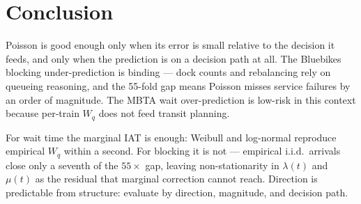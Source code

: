 \section{Conclusion}\label{sec:conclusion}

Poisson is good enough only when its error is small relative to the decision it feeds, and only when the prediction is on a decision path at all. The Bluebikes blocking under-prediction is binding --- dock counts and rebalancing rely on queueing reasoning, and the 55-fold gap means Poisson misses service failures by an order of magnitude. The MBTA wait over-prediction is low-risk in this context because per-train $W_q$ does not feed transit planning.

For wait time the marginal IAT is enough: Weibull and log-normal reproduce empirical $W_q$ within a second. For blocking it is not --- empirical i.i.d.\ arrivals close only a seventh of the $55\times$ gap, leaving non-stationarity in $\lambda(t)$ and $\mu(t)$ as the residual that marginal correction cannot reach. Direction is predictable from structure: evaluate by direction, magnitude, and decision path.
